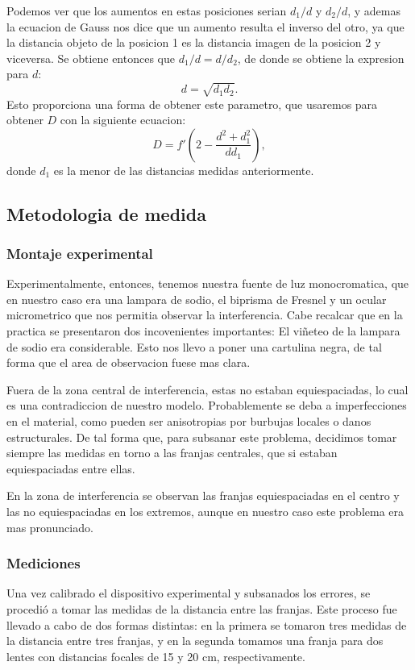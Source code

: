 \documentclass[a4paper,11pt]{article}
\begin{document}
Podemos ver que los aumentos en estas posiciones serian $d_1/d$ y $d_2/d$, y ademas
la ecuacion de Gauss nos dice que un aumento resulta el inverso del otro, ya que la
distancia objeto de la posicion 1 es la distancia imagen de la posicion 2 y viceversa.
Se obtiene entonces que $d_1/d=d/d_2$, de donde se obtiene la expresion para $d$:
\begin{equation}
d=\sqrt{d_1d_2}.
\end{equation}
Esto proporciona una forma de obtener este parametro, que usaremos para obtener $D$
con la siguiente ecuacion:
\begin{equation}
D=f'\left(2-\frac{d^2+d_1^2}{d d_1}\right),
\end{equation}
donde $d_1$ es la menor de las distancias medidas anteriormente.


\subsection{Metodologia de medida}
\subsubsection{Montaje experimental}
Experimentalmente, entonces, tenemos nuestra fuente de luz monocromatica, que en
nuestro caso era una lampara de sodio, el biprisma de Fresnel y un ocular
micrometrico que nos permitia observar la interferencia.
Cabe recalcar que en la practica se presentaron dos incovenientes importantes:
El viñeteo de la lampara de sodio era considerable. Esto nos llevo a poner una
cartulina negra, de tal forma que el area de observacion fuese mas clara.

Fuera de la zona central de interferencia, estas no estaban equiespaciadas, lo cual
es una contradiccion de nuestro modelo. Probablemente se deba a imperfecciones en
el material, como pueden ser anisotropias por burbujas locales o danos estructurales.
De tal forma que, para subsanar este problema, decidimos tomar siempre las medidas
en torno a las franjas centrales, que si estaban equiespaciadas entre ellas.

En la zona de interferencia se observan las franjas equiespaciadas en el centro y
las no equiespaciadas en los extremos, aunque en nuestro caso este problema era mas
pronunciado.

\subsubsection{Mediciones}
Una vez calibrado el dispositivo experimental y subsanados los errores, se procedió a tomar las medidas de la distancia entre las franjas.
Este proceso fue llevado a cabo de dos formas distintas: en la primera se tomaron
tres medidas de la distancia entre tres franjas, y en la segunda tomamos una franja
para dos lentes con distancias focales de 15 y 20 cm, respectivamente.
\end{document}
